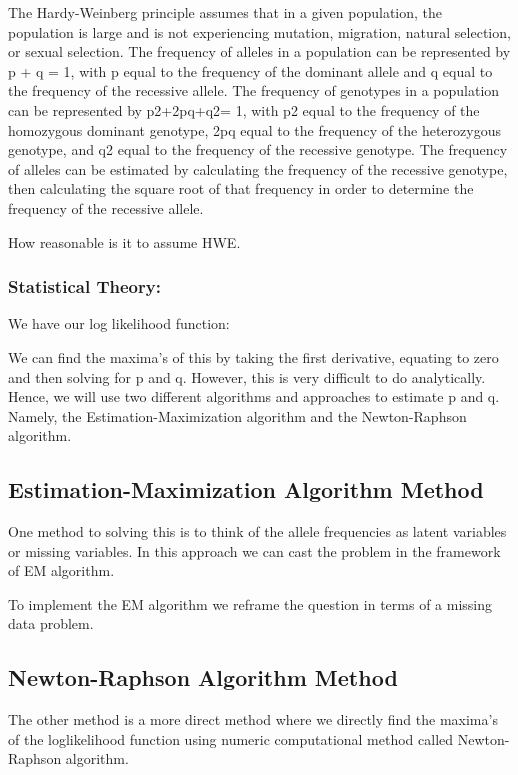 \documentclass[]{article}
\begin{document}
The Hardy-Weinberg principle assumes that in a given population, the
population is large and is not experiencing mutation, migration, natural
selection, or sexual selection. The frequency of alleles in a population
can be represented by p + q = 1, with p equal to the frequency of the
dominant allele and q equal to the frequency of the recessive allele.
The frequency of genotypes in a population can be represented by
p2+2pq+q2= 1, with p2 equal to the frequency of the homozygous dominant
genotype, 2pq equal to the frequency of the heterozygous genotype, and
q2 equal to the frequency of the recessive genotype. The frequency of
alleles can be estimated by calculating the frequency of the recessive
genotype, then calculating the square root of that frequency in order to
determine the frequency of the recessive allele.

How reasonable is it to assume HWE.

\subsubsection{Statistical Theory:}\label{statistical-theory}

We have our log likelihood function:

We can find the maxima's of this by taking the first derivative,
equating to zero and then solving for p and q. However, this is very
difficult to do analytically. Hence, we will use two different
algorithms and approaches to estimate p and q. Namely, the
Estimation-Maximization algorithm and the Newton-Raphson algorithm.

\subsection{Estimation-Maximization Algorithm
Method}\label{estimation-maximization-algorithm-method}

One method to solving this is to think of the allele frequencies as
latent variables or missing variables. In this approach we can cast the
problem in the framework of EM algorithm.

To implement the EM algorithm we reframe the question in terms of a
missing data problem.

\subsection{Newton-Raphson Algorithm
Method}\label{newton-raphson-algorithm-method}

The other method is a more direct method where we directly find the
maxima's of the loglikelihood function using numeric computational
method called Newton-Raphson algorithm.
\end{document}
